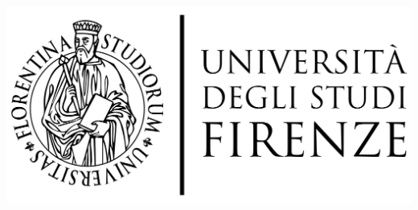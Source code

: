\documentclass[10pt]{article}
\begin{document}
\par\medskip
\begin{center}
\includegraphics[scale=0.1,center]{unifilogo/firenze2}
\end{center}
\end{document}
